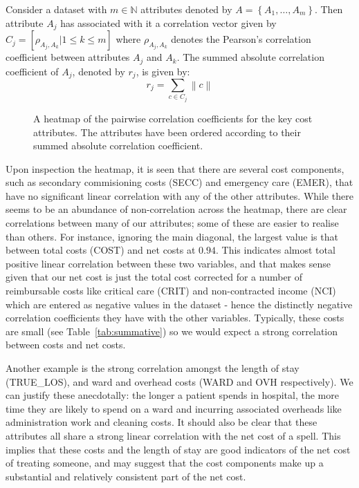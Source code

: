 \begin{definition}
    Consider a dataset with \(m \in \mathbb{N}\) attributes denoted
    by \(A = \left\{A_1, \ldots, A_m\right\}\). Then attribute \(A_j\) has
    associated with it a correlation vector given by \(C_j = \left[
    \rho_{A_j,A_k} | 1 \leq k \leq m\right]\) where \(\rho_{A_j, A_k}\) denotes
    the Pearson's correlation coefficient between attributes \(A_j\) and
    \(A_k\). The summed absolute correlation coefficient of \(A_j\), denoted by
    \(r_j\), is given by:
    \[
        r_j = \sum_{c \in C_j} \left\| c \right\|
    \]
\end{definition}

\begin{figure}[htbp]
    \caption{A heatmap of the pairwise correlation coefficients for the key cost
        attributes. The attributes have been ordered according to their summed
        absolute correlation coefficient.}%
    \label{fig:corr_heatmap}
\end{figure}

Upon inspection the heatmap, it is seen that there are several cost components,
such as secondary commisioning costs (SECC) and emergency care
(EMER), that have no significant linear correlation with any of the other
attributes. While there seems to be an abundance of non-correlation across the
heatmap, there are clear correlations between many of our attributes; some of
these are easier to realise than others. For instance, ignoring the main
diagonal, the largest value is that between total costs (COST) and net costs at
\(0.94\). This indicates almost total positive linear correlation between these
two variables, and that makes sense given that our net cost is just the total
cost corrected for a number of reimbursable costs like critical care (CRIT)
and non-contracted income (NCI) which are entered as negative values in the
dataset \-- hence the distinctly negative correlation coefficients they have
with the other variables. Typically, these costs are small (see
Table~\ref{tab:summative}) so we would expect a strong correlation between costs
and net costs.

Another example is the strong correlation amongst the length of stay
(TRUE\_LOS), and ward and overhead costs (WARD and OVH respectively). We can
justify these anecdotally: the longer a patient spends in hospital, the more
time they are likely to spend on a ward and incurring associated overheads like
administration work and cleaning costs. It should also be clear that these
attributes all share a strong linear correlation with the net cost of a spell.
This implies that these costs and the length of stay are good indicators of the
net cost of treating someone, and may suggest that the cost components make up a
substantial and relatively consistent part of the net cost.

